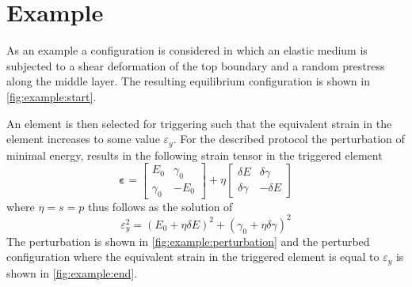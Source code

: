 \documentclass[fleqn]{goose-article}
\begin{document}
\clearpage

\section*{Example}

As an example a configuration is considered in which an elastic medium is subjected
to a shear deformation of the top boundary and a random prestress along the middle layer.
The resulting equilibrium configuration is shown in \cref{fig:example:start}.

An element is then selected for triggering such that the equivalent strain in the element
increases to some value $\varepsilon_y$.
For the described protocol the perturbation of minimal energy, results in the following
strain tensor in the triggered element
\begin{equation}
    \bm{\varepsilon} =
    \begin{bmatrix}
        E_0 & \gamma_0 \\
        \gamma_0 & - E_0
    \end{bmatrix}
    + \eta
    \begin{bmatrix}
        \delta E & \delta \gamma \\
        \delta \gamma & - \delta E
    \end{bmatrix}
\end{equation}
where $\eta = s = p$ thus follows as the solution of
\begin{equation}
    \varepsilon_y^2 = (E_0 + \eta \delta E)^2 + (\gamma_0 + \eta \delta \gamma)^2
\end{equation}
The perturbation is shown in \cref{fig:example:perturbation} and the perturbed configuration
where the equivalent strain in the triggered element is equal to $\varepsilon_y$ is shown
in \cref{fig:example:end}.
\end{document}
